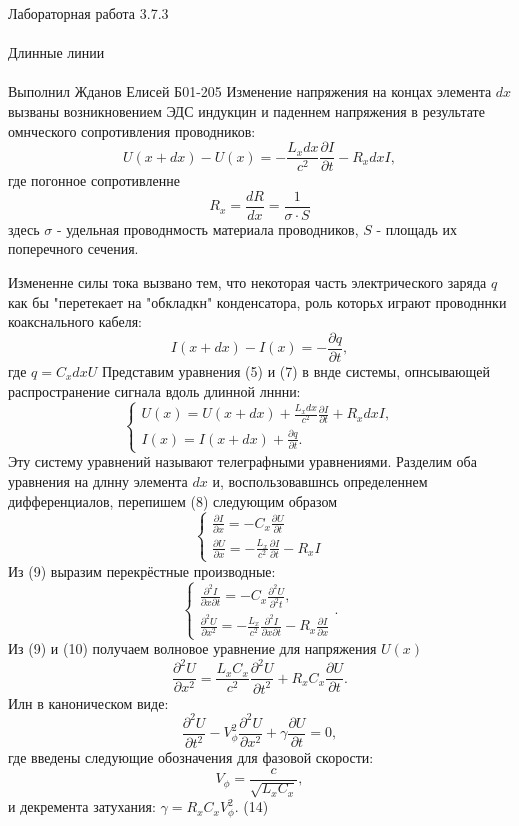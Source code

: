 \documentclass{astroedu-lab}
\begin{document}
\begin{problem}{\huge Лабораторная работа 3.7.3\\\\Длинные линии\\\\Выполнил Жданов Елисей Б01-205}
Изменение напряжения на концах элемента $d x$ вызваны возникновением ЭДС индукцин и паденнем напряжения в результате омнческого сопротивления проводников:
$$
U(x+d x)-U(x)=-\frac{L_x d x}{c^2} \frac{\partial I}{\partial t}-R_x d x I,
$$
где погонное сопротивленне
$$
R_x=\frac{d R}{d x}=\frac{1}{\sigma \cdot S}
$$
здесь $\sigma$ - удельная проводнмость материала проводников, $S$ - площадь их поперечного сечения.

Измененне силы тока вызвано тем, что некоторая часть электрического заряда $q$ как бы "перетекает на "обкладкн" конденсатора, роль которьх играют проводннки коакснального кабеля:
$$
I(x+d x)-I(x)=-\frac{\partial q}{\partial t},
$$
где $q=C_x d x U$
Представим уравнения (5) и (7) в внде системы, опнсывающей распространение сигнала вдоль длинной лннни:
$$
\left\{\begin{array}{l}
U(x)=U(x+d x)+\frac{L_x d x}{c^2} \frac{\partial I}{\partial t}+R_x d x I, \\
I(x)=I(x+d x)+\frac{\partial q}{\partial t} .
\end{array}\right.
$$
Эту систему уравнений называют телеграфными уравнениями. Разделим оба уравнения на длнну элемента $d x$ и, воспользовавшнсь определеннем дифференциалов, перепишем (8) следующим образом
$$
\left\{\begin{array}{l}
\frac{\partial I}{\partial x}=-C_x \frac{\partial U}{\partial t} \\
\frac{\partial U}{\partial x}=-\frac{L_x}{c^2} \frac{\partial I}{\partial t}-R_x I
\end{array}\right.
$$
Из (9) выразим перекрёстные производные:
$$
\left\{\begin{array}{l}
\frac{\partial^2 I}{\partial x \partial t}=-C_x \frac{\partial^2 U}{\partial^2 t}, \\
\frac{\partial^2 U}{\partial x^2}=-\frac{L_x}{c^2} \frac{\partial^2 I}{\partial x \partial t}-R_x \frac{\partial I}{\partial x}
\end{array} .\right.
$$
Из (9) и (10) получаем волновое уравнение для напряжения $U(x)$
$$
\frac{\partial^2 U}{\partial x^2}=\frac{L_x C_x}{c^2} \frac{\partial^2 U}{\partial t^2}+R_x C_x \frac{\partial U}{\partial t} .
$$
Илн в каноническом виде:
$$
\frac{\partial^2 U}{\partial t^2}-V_\phi^2 \frac{\partial^2 U}{\partial x^2}+\gamma \frac{\partial U}{\partial t}=0,
$$
где введены следующие обозначения для фазовой скорости:
$$
V_\phi=\frac{c}{\sqrt{L_x C_x}},
$$
и декремента затухания:
$\gamma=R_x C_x V_\phi^2$.
(14)









\end{problem}
\end{document}
